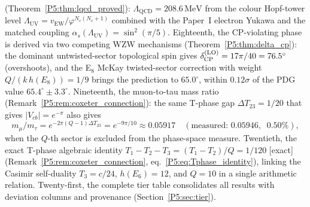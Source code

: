 \documentclass[11pt,a4paper]{article}
\theoremstyle{definition}
\theoremstyle{remark}
\newcommand{\vp}{\varphi}
\newcommand{\vEW}{v_{\mathrm{EW}}}
\newcommand{\LUV}{\Lambda_{\mathrm{UV}}}
\newcommand{\LQCD}{\Lambda_{\mathrm{QCD}}}
\begin{document}
(Theorem~\ref{P5:thm:lqcd_proved}): $\LQCD = 208.6\,\mathrm{MeV}$ from the
colour Hopf-tower level $\LUV = \vEW/\vp^{N_c(N_c+1)}$ combined with
the Paper~I electron Yukawa and the matched coupling $\alpha_s(\LUV)=\sin^2(\pi/5)$.
Eighteenth, the CP-violating phase is derived via two competing WZW mechanisms
(Theorem~\ref{P5:thm:delta_cp}): the dominant untwisted-sector topological spin
gives $\delta_{\rm CP}^{\rm(LO)} = 17\pi/40 = 76.5^\circ$ (overshoots), and the
E$_8$ McKay twisted-sector correction with weight $Q/(k\,h(E_8)) = 1/9$ brings
the prediction to $65.0^\circ$, within $0.12\sigma$ of the PDG value $65.4^\circ\pm3.3^\circ$.
Nineteenth, the muon-to-tau mass ratio (Remark~\ref{P5:rem:coxeter_connection}):
the same T-phase gap $\Delta T_{23}=1/20$ that gives $|V_{cb}|=e^{-\pi}$ also gives
\begin{equation*}
  m_\mu/m_\tau = e^{-2\pi(Q-1)\Delta T_{23}} = e^{-9\pi/10} \approx 0.05917
  \quad(\text{measured: }0.05946,\;\;0.50\%),
\end{equation*}
when the $Q$-th sector is excluded from the phase-space measure.
Twentieth, the exact T-phase algebraic identity
$T_1 - T_2 - T_3 = (T_1-T_2)/Q = 1/120$ [exact]
(Remark~\ref{P5:rem:coxeter_connection}, eq.~\eqref{P5:eq:Tphase_identity}),
linking the Casimir self-duality $T_3=c/24$, $h(E_6)=12$, and $Q=10$
in a single arithmetic relation.
Twenty-first, the complete tier table consolidates all results with
deviation columns and provenance (Section~\ref{P5:sec:tier}).
\end{document}
